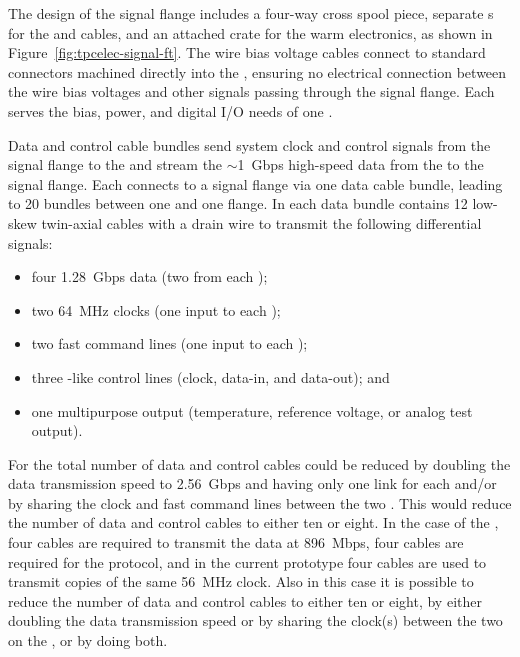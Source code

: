 The design of the signal flange includes a four-way cross spool 
piece, separate  \fdth{}s for the  and 
 cables, and an attached crate for the  
warm electronics, as shown in Figure~\ref{fig:tpcelec-signal-ft}.
The wire bias voltage cables connect to standard  
connectors machined directly into the  \fdth, ensuring 
no electrical connection between the wire bias voltages and other 
signals passing through the signal flange. Each  \fdth 
serves the bias, power, and digital I/O needs of one .  

Data and control cable bundles send system clock and control signals 
from the signal flange to the  and stream the $\sim$\SI{1}{Gbps} 
high-speed data from the  to the signal flange. Each 
 connects to a signal flange via one data cable bundle, 
leading to \num{20} bundles between one  and one flange. 
In  each data bundle contains 12 low-skew twin-axial cables with a drain 
wire to transmit the following differential signals:
\begin{itemize}
\item four \SI{1.28}{Gbps} data (two from each );
\item two \SI{64}{MHz} clocks (one input to each );
\item two fast command lines (one input to each );
\item three -like control lines (clock, data-in, and data-out); and
\item one multipurpose  output (temperature, 
reference voltage, or analog test output).
\end{itemize}
For  the total number of data and control cables could be 
reduced by doubling the data transmission speed to \SI{2.56}{Gbps}
and having only one link for each  and/or by
sharing the clock and fast command lines between the two 
 . This would reduce the number
of data and control cables to either ten or eight. In the
case of the , four cables are required to transmit
the data at \SI{896}{Mbps}, four cables are required for the
 protocol, and in the current  prototype
four cables are used to transmit copies of the same \SI{56}{MHz}
clock. Also in this case it is possible to reduce the 
number of data and control cables to either ten or eight, 
by either doubling the data transmission speed or by
sharing the clock(s) between the two  
on the , or by doing both.

